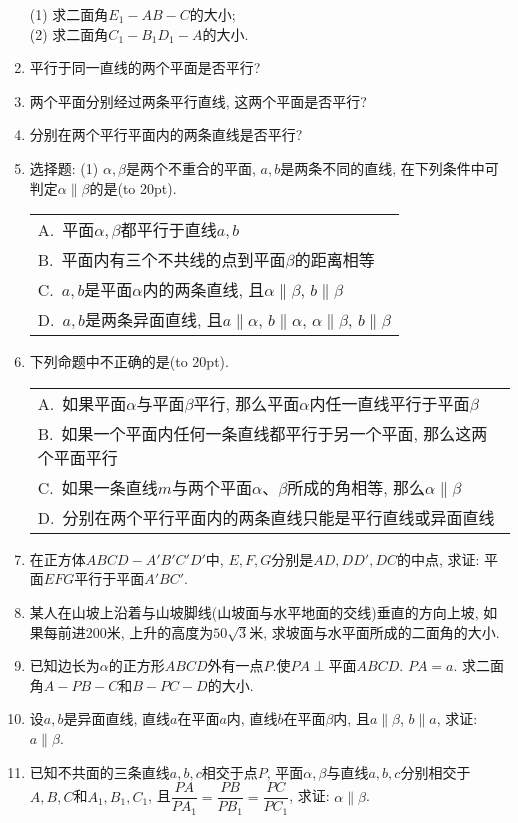 \documentclass[10pt,a4paper]{article}
\newcommand{\bracket}[1]{(\hbox to #1pt{})}
\newcommand{\onech}[4]{\par\begin{tabular}{p{.9\textwidth}}
A.~#1\\
B.~#2\\
C.~#3\\
D.~#4
\end{tabular}}
\begin{document}
\begin{enumerate}[1.]
\begin{center}
\end{center}
(1) 求二面角$E_1-AB-C$的大小;\\
(2) 求二面角$C_1-B_1D_1-A$的大小.
\item 平行于同一直线的两个平面是否平行?
\item 两个平面分别经过两条平行直线, 这两个平面是否平行?
\item 分别在两个平行平面内的两条直线是否平行?
\item 选择题:
(1) $\alpha,\beta$是两个不重合的平面, $a,b$是两条不同的直线, 在下列条件中可判定$\alpha \parallel\beta$的是\bracket{20}.
\onech{平面$\alpha,\beta$都平行于直线$a,b$}{平面内有三个不共线的点到平面$\beta$的距离相等}{$a,b$是平面$\alpha$内的两条直线, 且$\alpha \parallel\beta$, $b\parallel\beta$}{$a,b$是两条异面直线, 且$a\parallel\alpha$, $b\parallel\alpha$, $\alpha \parallel\beta$, $b\parallel\beta$}
\item 下列命题中不正确的是\bracket{20}.
\onech{如果平面$\alpha$与平面$\beta$平行, 那么平面$\alpha$内任一直线平行于平面$\beta$}{如果一个平面内任何一条直线都平行于另一个平面, 那么这两个平面平行}{如果一条直线$m$与两个平面$\alpha$、$\beta$所成的角相等, 那么$\alpha \parallel\beta$}{分别在两个平行平面内的两条直线只能是平行直线或异面直线}
\item 在正方体$ABCD-A'B'C'D'$中, $E,F,G$分别是$AD,DD',DC$的中点, 求证: 平面$EFG$平行于平面$A'BC'$.
\item 某人在山坡上沿着与山坡脚线(山坡面与水平地面的交线)垂直的方向上坡, 如果每前进$200$米, 上升的高度为$50\sqrt 3$米, 求坡面与水平面所成的二面角的大小.
\item 已知边长为$\alpha$的正方形$ABCD$外有一点$P$.使$PA\perp$平面$ABCD$. $PA=a$. 求二面角$A-PB-C$和$B-PC-D$的大小.
\item 设$a,b$是异面直线, 直线$a$在平面$a$内, 直线$b$在平面$\beta$内, 且$a\parallel\beta$, $b\parallel a$, 求证: $a\parallel\beta$.
\item 已知不共面的三条直线$a,b,c$相交于点$P$, 平面$\alpha,\beta$与直线$a,b,c$分别相交于$A,B,C$和$A_1,B_1,C_1$, 且$\dfrac{PA}{PA_1}=\dfrac{PB}{PB_1}=\dfrac{PC}{PC_1}$, 求证: $\alpha \parallel\beta$.

\end{enumerate}
\end{document}
